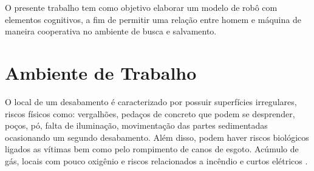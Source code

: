 \documentclass[
	article,			%
	10pt,				%
	oneside,			%
	a4paper,			%
	english,			%
	brazil,				%
	sumario=tradicional	
	]{abntex2}
\begin{document}
O presente trabalho tem como objetivo elaborar um modelo de robô com elementos cognitivos, a fim de permitir uma relação entre homem e máquina de maneira cooperativa no ambiente de busca e salvamento. 
%

\section{Ambiente de Trabalho}
O local de um desabamento é caracterizado por possuir superfícies irregulares, riscos físicos como: vergalhões, pedaços de concreto que podem se desprender, poços, pó, falta de iluminação, movimentação das partes sedimentadas ocasionando um segundo desabamento. Além disso, podem haver riscos biológicos ligados as vítimas bem como pelo rompimento de canos de esgoto. Acúmulo de gás, locais com pouco oxigênio e riscos relacionados a incêndio e curtos elétricos  \cite{Robin2004}.
\end{document}
